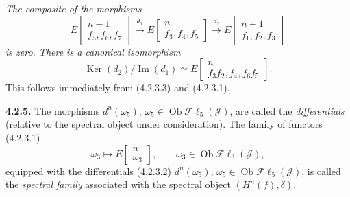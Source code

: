 \clearpage
{}%
\begingroup\small\setlength{\parskip}{0pt}\setlength{\emergencystretch}{2.5em}
\noindent\textit{The composite of the morphisms}
\[
E\!\begin{bmatrix}n-1\\ f_5,f_6,f_7\end{bmatrix}
\xrightarrow{d_1}
E\!\begin{bmatrix}n\\ f_3,f_4,f_5\end{bmatrix}
\xrightarrow{d_2}
E\!\begin{bmatrix}n+1\\ f_1,f_2,f_3\end{bmatrix}
\]
\textit{is zero. There is a canonical isomorphism}
\[
\operatorname{Ker}(d_2)\big/\operatorname{Im}(d_1)
\simeq
E\!\begin{bmatrix}n\\ f_3f_2,f_4,f_6f_5\end{bmatrix}.
\tag{4.2.4.1}
\]
This follows immediately from (4.2.3.3) and (4.2.3.1).

\medskip\noindent\textbf{4.2.5.}
The morphisms $d^n(\omega_5)$,
$\omega_5\in\operatorname{Ob}\mathcal{F}\ell_5(\mathcal J)$, are called
the \textit{differentials} (relative to the spectral object under
consideration). The family of functors (4.2.3.1)
\[
\omega_3\longmapsto
E\!\begin{bmatrix}n\\ \omega_3\end{bmatrix},
\qquad
\omega_3\in\operatorname{Ob}\mathcal{F}\ell_3(\mathcal J),
\]
equipped with the differentials (4.2.3.2) $d^n(\omega_5)$,
$\omega_5\in\operatorname{Ob}\mathcal{F}\ell_5(\mathcal J)$, is called
the \textit{spectral family} associated with the spectral object
$(H^n(f),\delta)$.

